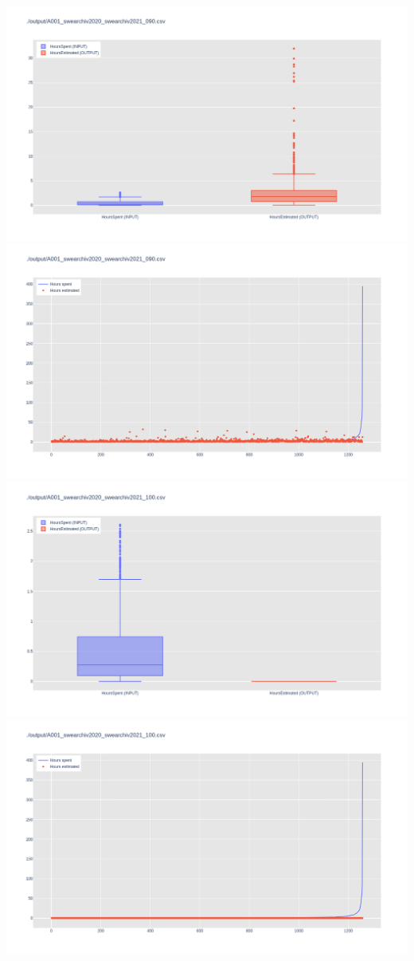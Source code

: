 \includegraphics[width=\textwidth]{Scripts/output/A001_swearchiv2020_swearchiv2021_090.csv.png}
\includegraphics[width=\textwidth]{Scripts/output/A001_swearchiv2020_swearchiv2021_090.csv.scatter.png}
\includegraphics[width=\textwidth]{Scripts/output/A001_swearchiv2020_swearchiv2021_100.csv.png}
\includegraphics[width=\textwidth]{Scripts/output/A001_swearchiv2020_swearchiv2021_100.csv.scatter.png}
